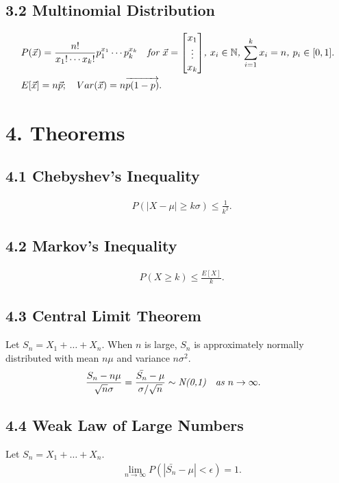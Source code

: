 \documentclass{article}
\begin{document}
\subsection*{3.2 Multinomial Distribution}
\begin{align}
    & P(\vec{x}) = \frac{n!}{x_1!\cdots x_k!}p_1^{x_1}\cdots p_k^{x_k} \quad \emph{for $\vec{x} = \begin{bmatrix}
        x_1 \\ \vdots \\ x_k
    \end{bmatrix}$, $x_i\in \mathbb{N}$, $\sum_{i=1}^k x_i = n$, $p_i\in [0,1]$}. \nonumber \\
    & E[\vec{x}] = n\vec{p}; \quad Var(\vec{x}) = n\overrightarrow{p(1-p)}. \nonumber
\end{align}

\newpage
\section*{4. Theorems}
\subsection*{4.1 Chebyshev's Inequality}
\begin{align}
    & P(|X-\mu| \ge k\sigma) \le \frac{1}{k^2}. \nonumber
\end{align}

\subsection*{4.2 Markov's Inequality}
\begin{align}
    & P(X \ge k) \le \frac{E[X]}{k}. \nonumber
\end{align}

\subsection*{4.3 Central Limit Theorem}
Let $S_n = X_1 + \dots + X_n$. When $n$ is large, $S_n$ is approximately normally distributed with mean $n\mu $ and variance $n\sigma^2$.
\begin{align}
    & \frac{S_n-n\mu}{\sqrt{n}\sigma} = \frac{\bar{S_n} - \mu}{\sigma / \sqrt{n}} \sim \emph{N(0,1)} \quad \emph{as $n\to\infty$}. \nonumber
\end{align}

\subsection*{4.4 Weak Law of Large Numbers}
Let $S_n = X_1 + \dots + X_n$. 
\begin{align}
    & \lim_{n\rightarrow\infty}P(|\bar{S_n}-\mu|<\epsilon) = 1. \nonumber
\end{align}
\end{document}
